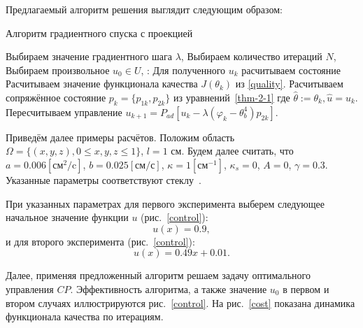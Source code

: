 \documentclass[10pt]{article}
\begin{document}
    Предлагаемый алгоритм решения выглядит следующим образом:
    \begin{algorithm}[H]
        \caption{Алгоритм градиентного спуска с проекцией}
        \begin{algorithmic}[1]
            \State Выбираем значение градиентного шага $\lambda$,
            \State Выбираем количество итераций $N$,
            \State Выбираем произвольное $u_0 \in U$,
            :
            \State Для полученного $u_k$ расчитываем состояние
            \State Расчитываем значение функционала качества $J(\theta_k)$ из \eqref{quality}.
            \State Расчитываем сопряжённое состояние $p_k=\{p_{1k},p_{2k}\}$ из
            уравнений~\eqref{thm-2-1} где $ \hat{\theta} := \theta_k, \hat{u}=u_k$.
            \State Пересчитываем управление
            $u_{k+1} = P_{ad}\left[ u_k - \lambda (\varphi_k - \theta_b^4)p_{2k} \right]$.
            \EndFor
        \end{algorithmic}
    \end{algorithm}
    Приведём далее примеры расчётов.
    Положим область $\Omega = \{(x, y, z), 0 \leq x, y, z \leq 1\}$, $l = 1$ см.
    Будем далее считать, что $a = 0.006[\text{см}^2/\text{c}]$, $b=0.025[\text{см}/\text{с}]$,
    $\kappa=1[\text{см}^{-1}]$, $\kappa_s = 0$, $A = 0$, $\gamma = 0.3$.
    Указанные параметры соответствуют стеклу~\cite{grenkin_13}.

    При указанных параметрах для первого эксперимента выберем следующее начальное значение
    функции $u$ (рис.~\ref{control}):
    \begin{equation}
        \label{test_function_1}
        u(x)= 0.9,
    \end{equation}
    и для второго эксперимента (рис.~\ref{control}):
    \begin{equation}
        \label{test_function_2}
        u(x)=0.49x+0.01.
    \end{equation}

    Далее, применяя предложенный алгоритм решаем задачу оптимального управления $CP$.
    Эффективность алгоритма, а также значение $u_0$
    в первом и втором случаях иллюстрируются рис.~\ref{control}.
    На рис.~\ref{cost} показана динамика функционала качества по итерациям.
\end{document}
